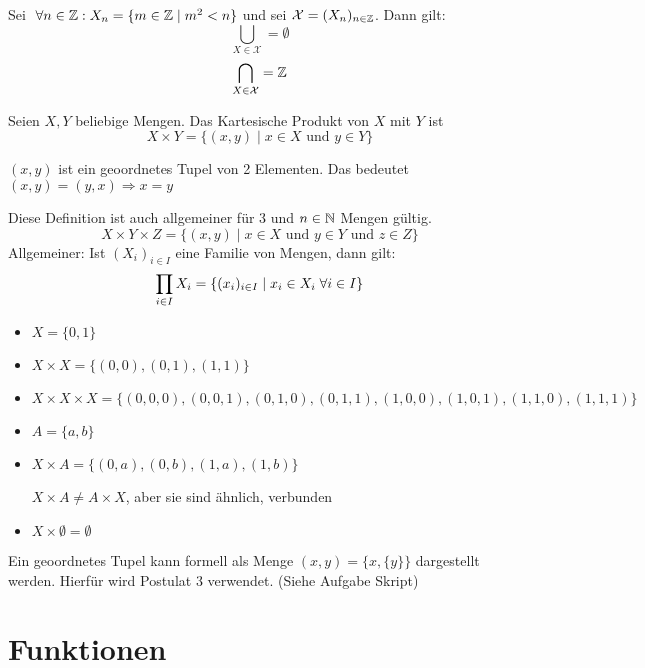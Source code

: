 \documentclass[main.tex]{subfiles}
\begin{document}
\begin{Beispiel}
  Sei $ \;\forall n \in \mathbb{Z} : X_n = \{ m \in \mathbb{Z} \mid m^2 < n \}$ und sei $\mathcal{X} = (X_n)_{n\in\mathbb{Z}}$. Dann gilt:
  $$ \bigcup_{X \in \mathcal{X}} =  \emptyset $$
  $$ \bigcap_{X \in \mathcal{X}} =  \mathbb{Z} $$

\end{Beispiel}

\begin{Definition}
  Seien $X,Y$ beliebige Mengen. Das Kartesische Produkt von $X$ mit $Y$ ist
  $$ X \times Y = \{(x,y) \mid x \in X \text{ und } y \in Y \} $$
  \begin{Bemerkung}
    $(x,y)$ ist ein geoordnetes Tupel von 2 Elementen. Das bedeutet $(x,y) = (y,x) \Rightarrow x=y$
  \end{Bemerkung}
  Diese Definition ist auch allgemeiner für 3 und $n \in \mathbb{N}$ Mengen gültig.
  $$ X \times Y \times Z = \{(x,y) \mid x \in X \text{ und } y \in Y  \text{ und } z \in Z \} $$
  Allgemeiner: Ist $ (X_i)_{i \in I} $ eine Familie von Mengen, dann gilt:
  $$\prod_{i \in I} X_i = \{ (x_i)_{i \in I} \mid x_i \in X_i \;\forall i \in I \}$$
\end{Definition}

\begin{Beispiel}
  \begin{itemize}
    \item $X = \{ 0,1 \}$
    \item $X \times X = \{ (0,0),(0,1),(1,1) \}$
    \item $X \times X \times X = \{ (0,0,0),(0,0,1),(0,1,0),(0,1,1),(1,0,0),(1,0,1),(1,1,0),(1,1,1) \}$
    \item $A= \{ a, b\} $
    \item $X \times A = \{ (0,a),(0,b),(1,a),(1,b) \} $
      \begin{Bemerkung}
        $X \times A \neq A \times X$, aber sie sind ähnlich, verbunden
      \end{Bemerkung}
    \item $X \times \emptyset = \emptyset$
  \end{itemize}
\end{Beispiel}

\begin{Bemerkung}
  Ein geoordnetes Tupel kann formell als Menge $(x,y) = \{ x, \{ y \} \}$ dargestellt werden. Hierfür wird Postulat 3 verwendet. (Siehe Aufgabe Skript)
\end{Bemerkung}


\section{Funktionen}
\end{document}
